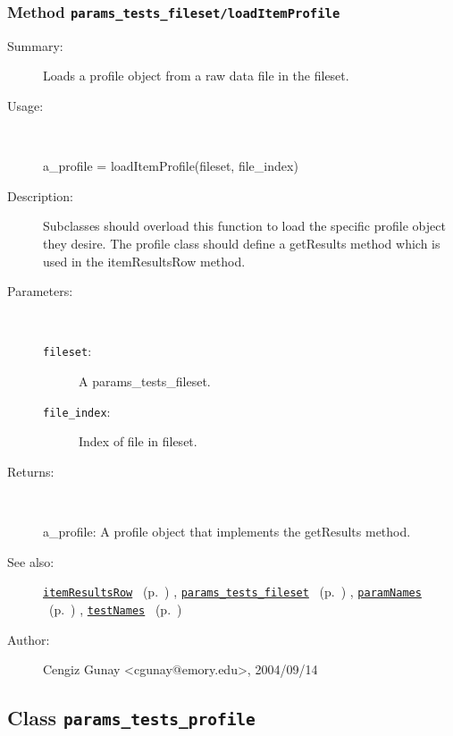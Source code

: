 \subsubsection[Method \texttt{loadItemProfile}]{Method \texttt{params\_tests\_fileset/loadItemProfile}}%
%
\label{ref_params_tests_fileset__loadItemProfile}%
\hypertarget{ref_params_tests_fileset__loadItemProfile}{}%
\begin{description}
\item[Summary:]Loads a profile object from a raw data file in the fileset.
%
\item[Usage:]~%
\begin{lyxcode}%
a\_profile = loadItemProfile(fileset, file\_index)
%
\end{lyxcode}%
%
\item[Description:]%
Subclasses should overload this function to load the specific profile
 object they desire. The profile class should define a getResults method
 which is used in the itemResultsRow method.
\item[Parameters:]~
\begin{description}%
\item[\texttt{fileset}:]
 A params\_tests\_fileset.
\item[\texttt{file\_index}:]
 Index of file in fileset.
\end{description}%
%
\item[Returns:]~

	a\_profile: A profile object that implements the getResults method.
%
%
\item[See also:]%
\hyperlink{ref_itemResultsRow}{\texttt{itemResultsRow}}%
\ (p.~\pageref{ref_itemResultsRow})%
%
, \hyperlink{ref_params_tests_fileset}{\texttt{params\_tests\_fileset}}%
\ (p.~\pageref{ref_params_tests_fileset})%
%
, \hyperlink{ref_paramNames}{\texttt{paramNames}}%
\ (p.~\pageref{ref_paramNames})%
%
, \hyperlink{ref_testNames}{\texttt{testNames}}%
\ (p.~\pageref{ref_testNames})%
%
%
\item[Author:]%
Cengiz Gunay <cgunay@emory.edu>, 2004/09/14%
\end{description}
\methodline%
\subsection{Class \texttt{params\_tests\_profile}}%
%
\label{ref_params_tests_profile}%
\hypertarget{ref_params_tests_profile}{}%
